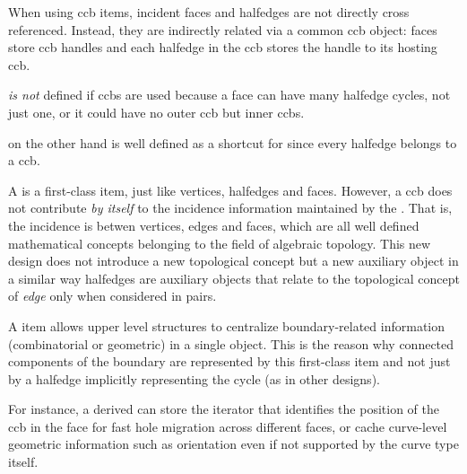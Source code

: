 {When using ccb items, incident faces and halfedges are not directly cross referenced. Instead,
they are indirectly related via a common ccb object: faces store ccb handles and each halfedge in the ccb  stores the handle to its hosting ccb.

 {\em is not} defined if ccbs are used because a face can have many halfedge cycles, not just one, or it could have no outer ccb but inner ccbs.

 on the other hand is well defined as a shortcut for 
since every halfedge belongs to a ccb.

A  is a first-class  item, just like vertices, halfedges and faces.
However, a ccb does not contribute {\em by itself} to the incidence information 
maintained by the . That is, the incidence is betwen vertices, edges and faces,
which are all well defined mathematical concepts belonging to the field of algebraic topology.
This new design does not introduce a new topological concept but a new
auxiliary object in a similar way halfedges are auxiliary objects that 
relate to the topological concept of {\em edge} only when considered in pairs.

A  item allows upper level structures to centralize boundary-related information
(combinatorial or geometric) in a single object. This is the reason why 
connected components of the boundary are represented by this first-class  item 
and not just by a halfedge implicitly representing the cycle (as in other designs).

For instance, a derived  can store the iterator that identifies the position of the ccb 
in the face for fast hole migration across different faces, or cache curve-level geometric
information such as orientation even if not supported by the curve type itself.
}

